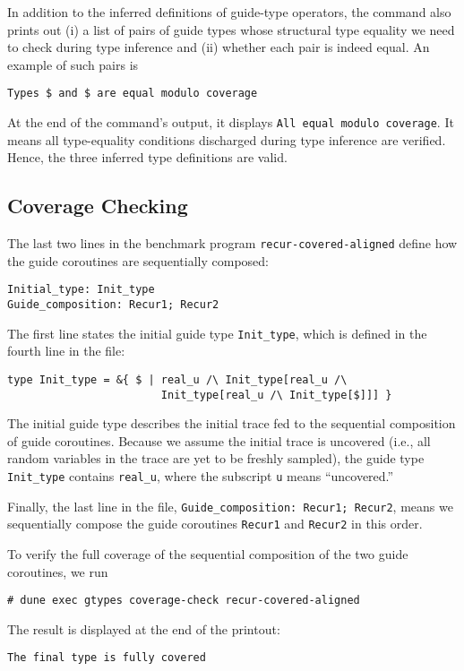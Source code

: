 In addition to the inferred definitions of guide-type operators, the command
also prints out (i) a list of pairs of guide types whose structural type
equality we need to check during type inference and (ii) whether each pair is
indeed equal.
%
An example of such pairs is
\begin{verbatim}
Types $ and $ are equal modulo coverage
\end{verbatim}
%
At the end of the command's output, it displays \texttt{All equal modulo
  coverage}.
%
It means all type-equality conditions discharged during type inference are
verified.
%
Hence, the three inferred type definitions are valid.

\subsection{Coverage Checking}

The last two lines in the benchmark program \texttt{recur-covered-aligned}
define how the guide coroutines are sequentially composed:
\begin{verbatim}
Initial_type: Init_type
Guide_composition: Recur1; Recur2
\end{verbatim}
%
The first line states the initial guide type \texttt{Init\_type}, which is
defined in the fourth line in the file:
\begin{verbatim}
type Init_type = &{ $ | real_u /\ Init_type[real_u /\
                        Init_type[real_u /\ Init_type[$]]] }
\end{verbatim}
%
The initial guide type describes the initial trace fed to the sequential
composition of guide coroutines.
%
Because we assume the initial trace is uncovered (i.e., all random variables in
the trace are yet to be freshly sampled), the guide type \texttt{Init\_type}
contains \texttt{real\_u}, where the subscript \texttt{u} means ``uncovered.''

Finally, the last line in the file, \texttt{Guide\_composition: Recur1; Recur2},
means we sequentially compose the guide coroutines \texttt{Recur1} and
\texttt{Recur2} in this order.

To verify the full coverage of the sequential composition of the two guide
coroutines, we run
\begin{verbatim}
# dune exec gtypes coverage-check recur-covered-aligned
\end{verbatim}
%
The result is displayed at the end of the printout:
\begin{verbatim}
The final type is fully covered
\end{verbatim}
